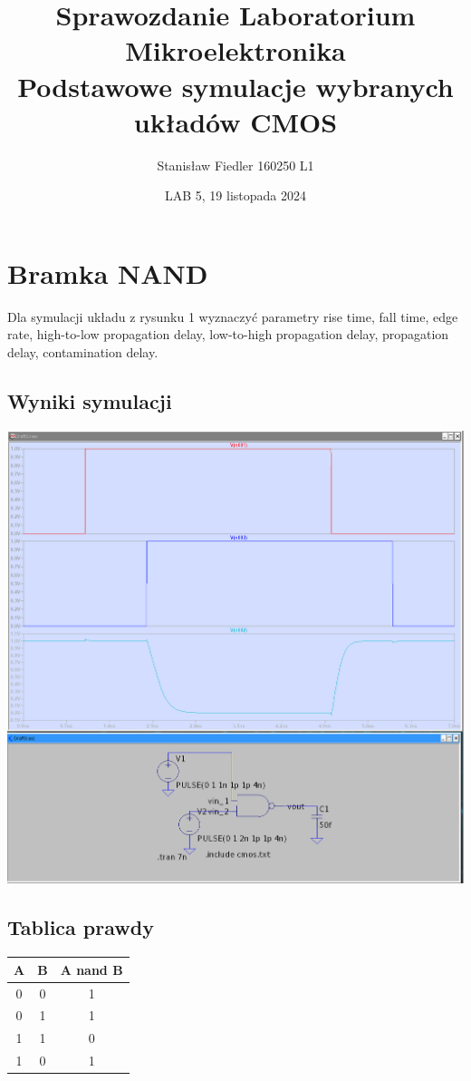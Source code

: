 \documentclass[a4paper, 11pt]{article}
\title{%
	\vspace{-1.5cm}
       \large Sprawozdanie Laboratorium Mikroelektronika \\
       \huge  Podstawowe symulacje wybranych układów CMOS}
\author{Stanisław Fiedler 160250 L1}
\date{LAB 5, 19 listopada 2024}
\begin{document}
\maketitle
\tableofcontents

\section{Bramka NAND}\label{sec:nand} %
Dla symulacji układu z rysunku 1 wyznaczyć parametry rise time, fall time, edge rate,
high-to-low propagation delay, low-to-high propagation delay, propagation delay, contamination delay.
\subsection{Wyniki symulacji}\label{sub:wyniki_symulacji} %
\begin{center}
	\includegraphics[scale=0.27]{images/nand.png}
\end{center}
\subsection{Tablica prawdy}\label{sub:tablica_prawdy} %
\begin{center}
	\begin{tabular}{c|c|c}
		A & B & A nand B \\
		\hline
		0 & 0 & 1        \\
		0 & 1 & 1        \\
		1 & 1 & 0        \\
		1 & 0 & 1        \\
	\end{tabular}
\end{center}
\end{document}
